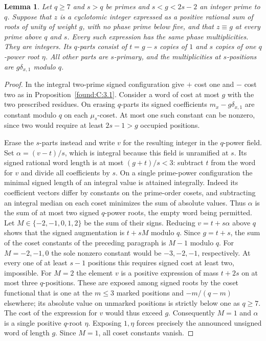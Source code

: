 \documentclass[11pt,a4paper]{article}
\numberwithin{equation}{section}
\newtheorem{lemma}[theorem]{Lemma}
\theoremstyle{remark}
\begin{document}
\begin{lemma}\label{found:J:2.1}\label{found:J:key:lem:near-updated}
Let $q\ge7$ and $s>q$ be primes and $s<g<2s-2$ an integer
prime to $q$. Suppose that $z$ is a cyclotomic integer expressed as a
positive rational sum of roots of unity of weight $g$, with no
phase prime below five, and that $z\equiv g$ at every prime above
$q$ and $s$. Every such expression has the same phase multiplicities.
They are integers. Its $q$-parts consist of $t=g-s$ copies of $1$
and $s$ copies of one $q$-power root $\eta$. All other parts are
$s$-primary, and the multiplicities at $s$-positions are
$g\delta_{x,1}$ modulo $q$.
\end{lemma}
\begin{proof}
In the integral two-prime signed configuration give $+$ cost one
and $-$ cost two as in Proposition~\ref{found:C:3.1}. Consider a word of
cost at most $g$ with the two prescribed residues. On erasing
$q$-parts its signed coefficients $m_x-g\delta_{x,1}$ are constant
modulo $q$ on each $\mu_s$-coset. At most one such constant can be
nonzero, since two would require at least $2s-1>g$ occupied positions.

Erase the $s$-parts instead and write $v$ for the resulting integer
in the $q$-power field. Set $\alpha=(v-t)/s$, which is integral
because this field is unramified at $s$. Its signed rational word length is at most $(g+t)/s<3$:
subtract $t$ from the word for $v$ and divide all coefficients by $s$.
On a single prime-power configuration the minimal signed length of an
integral value is attained integrally. Indeed its coefficient vectors
differ by constants on the prime-order cosets, and subtracting an
integral median on each coset minimizes the sum of absolute values.
Thus $\alpha$ is the sum of at most two signed $q$-power roots,
the empty word being permitted. Let $M\in\{-2,-1,0,1,2\}$ be the
sum of their signs. Reducing $v=t+s\alpha$ above $q$ shows that the
signed augmentation is $t+sM$ modulo $q$. Since $g=t+s$, the
sum of the coset constants of the preceding paragraph is $M-1$
modulo $q$. For $M=-2,-1,0$ the sole nonzero constant would be
$-3,-2,-1$, respectively. At every one of at least $s-1$ positions
this requires signed cost at least two, impossible. For $M=2$ the
element $v$ is a positive expression of mass $t+2s$ on at most
three $q$-positions. These are exposed among signed roots by the
coset functional that is one at the $m\le3$ marked positions and
$-m/(q-m)$ elsewhere; its absolute value on unmarked positions is
strictly below one as $q\ge7$. The cost of the expression for $v$
would thus exceed $g$. Consequently $M=1$ and $\alpha$ is a single
positive $q$-root $\eta$. Exposing $1,\eta$ forces precisely the
announced unsigned word of length $g$. Since $M=1$, all coset
constants vanish.


\end{proof}
\end{document}
